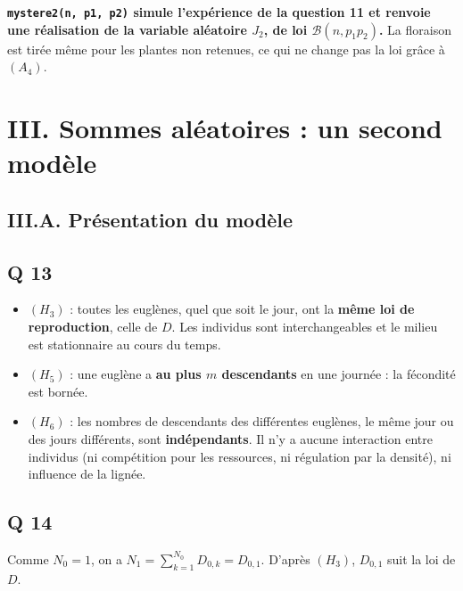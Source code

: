 \documentclass[11pt,a4paper]{article}
\providecommand{\tightlist}{\setlength{\itemsep}{0pt}\setlength{\parskip}{0pt}}
\begin{document}
\textbf{\texttt{mystere2(\allowbreak{}n,\allowbreak{}\ p1,\allowbreak{}\ p2)\allowbreak{}} simule l'expérience de la question 11 et renvoie une réalisation de la variable aléatoire \(J_2\), de loi \(\mathcal B(n,p_1p_2)\).} La floraison est tirée même pour les plantes non retenues, ce qui ne change pas la loi grâce à \((A_4)\).

\hypertarget{iii.-sommes-aluxe9atoires-un-second-moduxe8le}{%
\section{III. Sommes aléatoires : un second modèle}\label{iii.-sommes-aluxe9atoires-un-second-moduxe8le}}

\hypertarget{iii.a.-pruxe9sentation-du-moduxe8le}{%
\subsection{III.A. Présentation du modèle}\label{iii.a.-pruxe9sentation-du-moduxe8le}}

\hypertarget{q-13}{%
\subsection{Q 13}\label{q-13}}

\begin{itemize}
\tightlist
\item
  \((H_3)\) : toutes les euglènes, quel que soit le jour, ont la \textbf{même loi de reproduction}, celle de \(D\). Les individus sont interchangeables et le milieu est stationnaire au cours du temps.
\item
  \((H_5)\) : une euglène a \textbf{au plus \(m\) descendants} en une journée : la fécondité est bornée.
\item
  \((H_6)\) : les nombres de descendants des différentes euglènes, le même jour ou des jours différents, sont \textbf{indépendants}. Il n'y a aucune interaction entre individus (ni compétition pour les ressources, ni régulation par la densité), ni influence de la lignée.
\end{itemize}

\hypertarget{q-14}{%
\subsection{Q 14}\label{q-14}}

Comme \(N_0=1\), on a \(N_1=\sum_{k=1}^{N_0}D_{0,k}=D_{0,1}\). D'après \((H_3)\), \(D_{0,1}\) suit la loi de \(D\).
\end{document}
